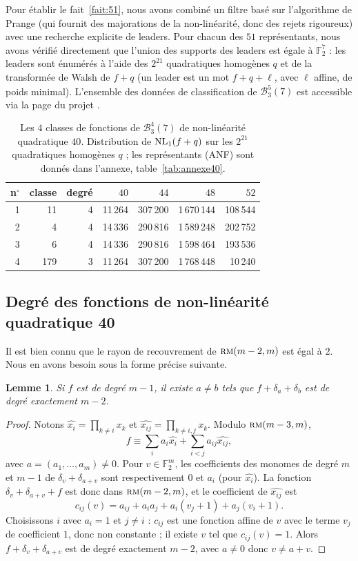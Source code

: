\documentclass[11pt,a4paper]{article}
\def\bst(#1,#2,#3){\mathcal{B}_{#1}^{#2}(#3)}
\def\NL(#1,#2){ {\rm NL}_{#1}(#2) }
\def\rmc(#1,#2){ \textsc {rm}(#1,#2) }
\def\fd(#1){\mathbb{F}_2^{#1}}
\theoremstyle{plain}
\newtheorem{lemma}[theorem]{Lemme}
\theoremstyle{definition}
\theoremstyle{remark}
\begin{document}
Pour établir le fait~\ref{fait:51}, nous avons combiné un filtre basé sur
l'algorithme de Prange (qui fournit des majorations de la non-linéarité, donc
des rejets rigoureux) avec une recherche explicite de leaders. Pour chacun des
$51$ représentants, nous avons vérifié directement que l'union des supports des
leaders est égale à $\fd(7)$ : les leaders sont énumérés à l'aide des
$2^{21}$ quadratiques homogènes $q$ et de la transformée de Walsh de $f+q$ (un
leader est un mot $f+q+\ell$, avec $\ell$ affine, de poids minimal). L'ensemble des
données de classification de $\bst(3,5,7)$ est accessible via la page du
projet \cite{GL26}.

\begin{table}[ht]
\centering
\caption{\label{tab:4classes}
Les $4$ classes de fonctions de $\bst(3,4,7)$ de non-linéarité quadratique
$40$. Distribution de $\NL(1,f+q)$ sur les $2^{21}$ quadratiques homogènes $q$ ;
les représentants (ANF) sont donnés dans l'annexe, table~\ref{tab:annexe40}.}
\begin{tabular}{rrrrrrr}
\toprule
n$^\circ$ & classe & degré & $40$ & $44$ & $48$ & $52$\\
\midrule
1 & 11  & 4 & 11\,264 & 307\,200 & 1\,670\,144 & 108\,544\\
2 & 4   & 4 & 14\,336 & 290\,816 & 1\,589\,248 & 202\,752\\
3 & 6   & 4 & 14\,336 & 290\,816 & 1\,598\,464 & 193\,536\\
4 & 179 & 3 & 11\,264 & 307\,200 & 1\,768\,448 & 10\,240\\
\bottomrule
\end{tabular}
\end{table}

\subsection{Degré des fonctions de non-linéarité quadratique 40}

Il est bien connu que le rayon de recouvrement de $\rmc(m-2,m)$ est égal à $2$.
Nous en avons besoin sous la forme précise suivante.

\begin{lemma}\label{lem:modif}
Si $f$ est de degré $m-1$, il existe $a\ne b$ tels que $f+\delta_a+\delta_b$
est de degré exactement $m-2$.
\end{lemma}
\begin{proof}
Notons $\widehat{x_i}=\prod_{k\ne i}x_k$ et $\widehat{x_{ij}}=\prod_{k\ne i,j}x_k$.
Modulo $\rmc(m-3,m)$,
$$
f\equiv\sum_i a_i\widehat{x_i}+\sum_{i<j}a_{ij}\widehat{x_{ij}},
$$
avec $a=(a_1,\dots,a_m)\ne 0$. Pour $v\in\fd(m)$, les coefficients des
monomes de degré $m$ et $m-1$ de $\delta_v+\delta_{a+v}$ sont respectivement
$0$ et $a_i$ (pour $\widehat{x_i}$). La fonction $\delta_v+\delta_{a+v}+f$ est
donc dans $\rmc(m-2,m)$, et le coefficient de $\widehat{x_{ij}}$ est
$$
c_{ij}(v)=a_{ij}+a_ia_j+a_i(v_j+1)+a_j(v_i+1).
$$
Choisissons $i$ avec $a_i=1$ et $j\ne i$ : $c_{ij}$ est une fonction affine de
$v$ avec le terme $v_j$ de coefficient $1$, donc non constante ; il existe $v$
tel que $c_{ij}(v)=1$. Alors $f+\delta_v+\delta_{a+v}$ est de degré exactement
$m-2$, avec $a\ne 0$ donc $v\ne a+v$.
\end{proof}
\end{document}
